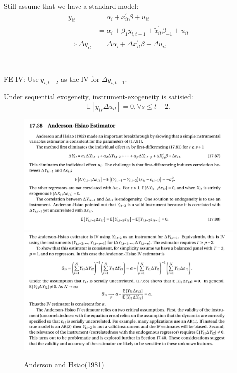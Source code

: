 Still assume that we have a standard model:
\begin{align*}
    y_{it} &= \alpha_i + x_{it}^{\prime} \beta + u_{it} \\
    &= \alpha_i + \beta_1 y_{i, t-1} + \tilde{x}_{it}^{\prime} \beta_{-1} + u_{it}  \\
    \Rightarrow \Delta y_{it} &= \Delta \alpha_i + \Delta x_{it}^{\prime} \beta + \Delta u_{it}
\end{align*}
\begin{definition}
    \

    FE-IV: Use $y_{i,t-2}$ as the IV for $\Delta y_{i,t-1}$.

    Under sequential exogeneity, instrument-exogeneity is satisied:
    \[\mathbb{E}[y_{is} \Delta u_{it}] = 0, \forall s\leq t-2.\]
\end{definition}

\begin{figure}[htbp!]
    \centering
    \includegraphics[width=\linewidth]{figures/Anderson-Hsiao-1981.png} \\
    \vspace{2mm} %
    \includegraphics[width=\linewidth]{figures/Anderson-Hsiao-1981-2.png}
    \caption{Anderson and Hsiao(1981)}
\end{figure}

